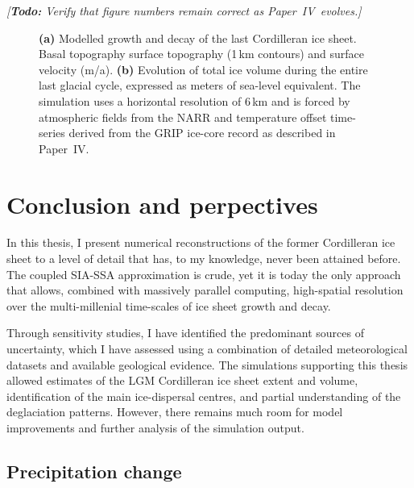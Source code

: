 \documentclass{article}
\newcommand{\todo}[1]{\emph{[\textbf{Todo:} #1]}}
\newcommand{\CCYC}[0]{Paper~IV}     %
\begin{document}
\todo{Verify that figure numbers remain correct as \CCYC\ evolves.}

\begin{figure}
  \centering
  \caption{\textbf{(a)} Modelled growth and decay of the last Cordilleran ice
           sheet. Basal topography surface topography (1\,km contours) and
           surface velocity (m/a).
           \textbf{(b)} Evolution of total ice volume during the entire last
           glacial cycle, expressed as meters of sea-level equivalent. The
           simulation uses a horizontal resolution of 6\,km and is forced by
           atmospheric fields from the NARR \citep{Mesinger.etal.2006} and
           temperature offset time-series derived from the GRIP
           \citep{Dansgaard.etal.1993} ice-core record as described in \CCYC.}
  \label{fig:plot-snapshots}
\end{figure}


\section{Conclusion and perpectives}

In this thesis, I present numerical reconstructions of the former Cordilleran
ice sheet to a level of detail that has, to my knowledge, never been attained
before. The coupled SIA-SSA approximation is crude, yet it is today the only
approach that allows, combined with massively parallel computing, high-spatial
resolution over the multi-millenial time-scales of ice sheet growth and decay.

Through sensitivity studies, I have identified the predominant sources of
uncertainty, which I have assessed using a combination of detailed
meteorological datasets and available geological evidence. The simulations
supporting this thesis allowed estimates of the LGM Cordilleran ice sheet
extent and volume, identification of the main ice-dispersal centres, and
partial understanding of the deglaciation patterns. However, there remains much
room for model improvements and further analysis of the simulation output.


\subsection{Precipitation change}
\end{document}
